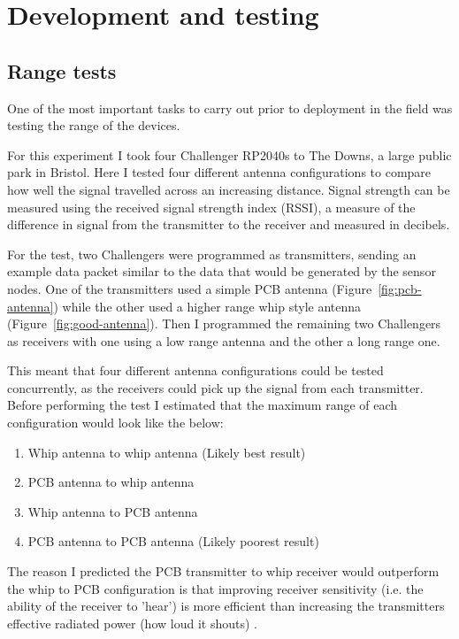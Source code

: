 \section{Development and testing}

\subsection{Range tests}\label{sec:range-tests}

One of the most important tasks to carry out prior to deployment in the field
was testing the range of the devices.

For this experiment I took four Challenger RP2040s to The Downs, a large public
park in Bristol. Here I tested four different antenna configurations to compare
how well the signal travelled across an increasing distance. Signal strength can
be measured using the received signal strength index (RSSI), a measure of the
difference in signal from the transmitter to the receiver and measured in
decibels.

For the test, two Challengers were programmed as transmitters, sending an
example data packet similar to the data that would be generated by the sensor
nodes. One of the transmitters used a simple PCB antenna
(Figure~\ref{fig:pcb-antenna}) while the other used a higher range whip style
antenna (Figure~\ref{fig:good-antenna}). Then I programmed the remaining two
Challengers as receivers with one using a low range antenna and the other a long
range one.

This meant that four different antenna configurations could be tested
concurrently, as the receivers could pick up the signal from each transmitter.
Before performing the test I estimated that the maximum range of each
configuration would look like the below:

\begin{enumerate}
    \item Whip antenna to whip antenna (Likely best result)
    \item PCB antenna to whip antenna
    \item Whip antenna to PCB antenna
    \item PCB antenna to PCB antenna (Likely poorest result)
\end{enumerate}

The reason I predicted the PCB transmitter to whip receiver would outperform the
whip to PCB configuration is that improving receiver sensitivity (i.e. the
ability of the receiver to 'hear') is more efficient than increasing the
transmitters effective radiated power (how loud it shouts) \cite{simpulse25}.


